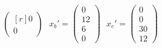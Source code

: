 \documentclass{article}
\begin{document}
\begin{itemize}
\begin{align*}
\begin{pmatrix*}[r]
            0\\
            0
        \end{pmatrix*}
        \:\:\:
        x_b' = \begin{pmatrix}
            0\\
            12\\
            6\\
            0
        \end{pmatrix}
        \:\:\:
        x_c' = \begin{pmatrix}
            0\\
            0\\
            30\\
            12
        \end{pmatrix}
    \end{align*}    
    
\end{itemize}
\end{document}
